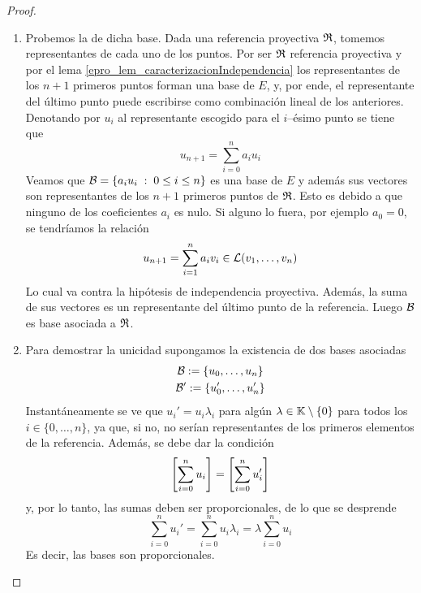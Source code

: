 \begin{proof}
	\begin{enumerate}
		\item Probemos la  de dicha base. Dada una referencia proyectiva $\mathfrak{R}$, tomemos representantes de cada uno de los puntos. Por ser $\mathfrak{R}$ referencia proyectiva y por el lema \ref{epro_lem_caracterizacionIndependencia} los representantes de los $n+1$ primeros puntos forman una base de $E$, y, por ende, el representante del último punto puede escribirse como combinación lineal de los anteriores. Denotando por $u_i$ al representante escogido para el $i$--ésimo punto se tiene que
		\begin{equation*}
			u_{n+1}=\sum_{i=0}^{n}a_iu_i
		\end{equation*}
		Veamos que $\mathcal{B}=\{a_iu_i\;:\; 0\leq i\leq n\}$ es una base de $E$ y además sus vectores son representantes de los $n+1$ primeros puntos de $\mathfrak{R}$. Esto es debido a que ninguno de los coeficientes $a_i$ es nulo. Si alguno lo fuera, por ejemplo $a_0=0$, se tendríamos la relación
		\begin{equation*}
			u_{n+1}=\sum_{i=1}^{n}a_iv_i\in\mathcal{L}(v_1,\dots,v_n)	
		\end{equation*}
		Lo cual va contra la hipótesis de independencia proyectiva. Además, la suma de sus vectores es un representante del último punto de la referencia. Luego $\mathcal{B}$ es base asociada a $\mathfrak{R}$.
		\item Para demostrar la unicidad supongamos la existencia de dos bases asociadas
		\begin{gather*}
			\mathcal{B}:=\{u_0,\dots,u_n\}\\
			\mathcal{B}':=\{u_0',\dots,u_n'\}
		\end{gather*}
		Instantáneamente se ve que $u_i'=u_i\lambda_i$ para algún $\lambda\in\mathbb{K}\setminus\{0\}$ para todos los $i\in\{0,\dots,n\}$, ya que, si no, no serían representantes de los primeros elementos de la referencia. Además, se debe dar la condición
		\begin{equation*}
			\left [ \sum_{i=0}^{n}u_i \right ]=\left [ \sum_{i=0}^{n}u_i' \right ]
		\end{equation*}
		y, por lo tanto, las sumas deben ser proporcionales, de lo que se desprende
		\begin{equation*}
			\sum_{i=0}^{n}u_i'=\sum_{i=0}^{n}u_i\lambda_i=\lambda\sum_{i=0}^{n}u_i
		\end{equation*}
		Es decir, las bases son proporcionales.\qedhere
	\end{enumerate}
\end{proof}
